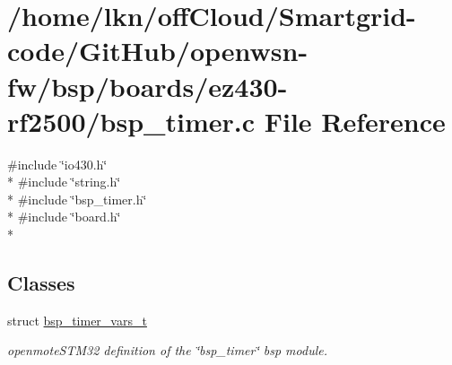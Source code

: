 \hypertarget{ez430-rf2500_2bsp__timer_8c}{}\section{/home/lkn/off\+Cloud/\+Smartgrid-\/code/\+Git\+Hub/openwsn-\/fw/bsp/boards/ez430-\/rf2500/bsp\+\_\+timer.c File Reference}
\label{ez430-rf2500_2bsp__timer_8c}
{\ttfamily \#include \char`\"{}io430.\+h\char`\"{}}\\*
{\ttfamily \#include \char`\"{}string.\+h\char`\"{}}\\*
{\ttfamily \#include \char`\"{}bsp\+\_\+timer.\+h\char`\"{}}\\*
{\ttfamily \#include \char`\"{}board.\+h\char`\"{}}\\*
\subsection*{Classes}
\begin{DoxyCompactItemize}
\item 
struct \hyperlink{structbsp__timer__vars__t}{bsp\+\_\+timer\+\_\+vars\+\_\+t}
\begin{DoxyCompactList}\small\item\em openmote\+S\+T\+M32 definition of the \char`\"{}bsp\+\_\+timer\char`\"{} bsp module. \end{DoxyCompactList}\end{DoxyCompactItemize}
